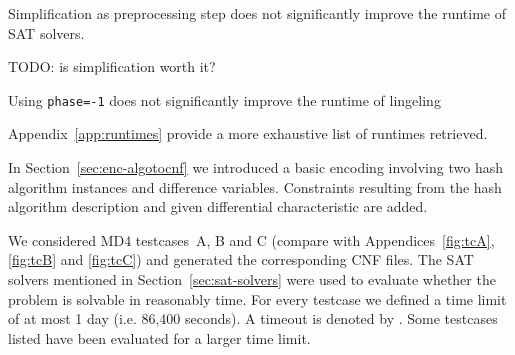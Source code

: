 \begin{prop}
  Simplification as preprocessing step does not significantly improve the runtime of SAT solvers.
\end{prop}

TODO: is simplification worth it?

\begin{prop}
  Using \texttt{\textendash{}\textendash{}phase=-1} does not significantly
  improve the runtime of lingeling
\end{prop}


Appendix~\ref{app:runtimes} provide a more exhaustive list of runtimes retrieved.

In Section~\ref{sec:enc-algotocnf} we introduced a basic encoding involving two hash algorithm
instances and difference variables. Constraints resulting from the hash algorithm description
and given differential characteristic are added.

We considered MD4 testcases~A, B and C (compare with Appendices~\ref{fig:tcA}, \ref{fig:tcB} and \ref{fig:tcC})
and generated the corresponding CNF files. The SAT solvers mentioned in Section~\ref{sec:sat-solvers}
were used to evaluate whether the problem is solvable in reasonably time. For every testcase we
defined a time limit of at most 1 day (i.e. 86,400 seconds). A timeout is denoted by \timeout.
Some testcases listed have been evaluated for a larger time limit.

